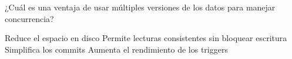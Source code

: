 \question[1] ¿Cuál es una ventaja de usar múltiples versiones de los datos para manejar concurrencia?
\begin{choices}
\choice Reduce el espacio en disco
\CorrectChoice Permite lecturas consistentes sin bloquear escritura
\choice Simplifica los commits
\choice Aumenta el rendimiento de los triggers
\end{choices}